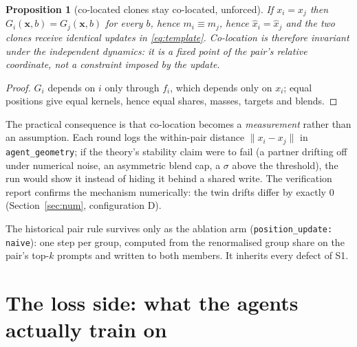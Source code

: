 \documentclass[11pt]{article}
\newtheorem{proposition}{Proposition}
\theoremstyle{remark}
\newcommand{\bx}{\mathbf{x}}
\newcommand{\cfg}[1]{\texttt{#1}}
\begin{document}
\begin{proposition}[co-located clones stay co-located, unforced]
\label{prop:pairs}
If $x_i=x_j$ then $G_i(\bx,b)=G_j(\bx,b)$ for every $b$, hence
$m_i\equiv m_j$, hence $\hat x_i=\hat x_j$ and the two clones receive
\emph{identical} updates in \eqref{eq:template}. Co-location is therefore
invariant under the independent dynamics: it is a fixed point of the pair's
relative coordinate, not a constraint imposed by the update.
\end{proposition}
\begin{proof}
$G_i$ depends on $i$ only through $f_i$, which depends only on $x_i$; equal
positions give equal kernels, hence equal shares, masses, targets and blends.
\end{proof}

\noindent The practical consequence is that co-location becomes a
\emph{measurement} rather than an assumption. Each round logs the within-pair
distance $\|x_i-x_j\|$ in \texttt{agent\_geometry}; if the theory's stability
claim were to fail (a partner drifting off under numerical noise, an
asymmetric blend cap, a $\sigma$ above the threshold), the run would show it
instead of hiding it behind a shared write. The verification report confirms
the mechanism numerically: the twin drifts differ by exactly $0$
(Section~\ref{sec:num}, configuration D).

The historical pair rule survives only as the ablation arm
(\cfg{position\_update: naive}): one step per group, computed from the
renormalised group share on the pair's top-$k$ prompts and written to both
members. It inherits every defect of S1.

\section{The loss side: what the agents actually train on}
\label{sec:loss}
\end{document}
